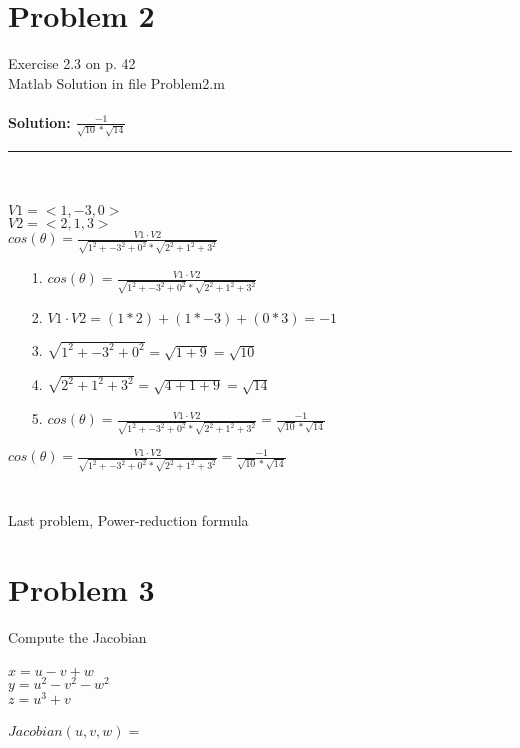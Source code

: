 \documentclass[12pt]{article}
\begin{document}
\section{Problem 2}	
Exercise 2.3 on p. 42\\ 
Matlab Solution in file Problem2.m\\ \\
\textbf{Solution: {\LARGE $ \frac{-1}{\sqrt{10} * \sqrt{14}}$ }}\\

\noindent\rule{22cm}{0.4pt}
\\ \\
$V1 = <1, -3, 0> $\\
$V2 = <2, 1, 3> $\\

{\Large$cos(\theta) = \frac{ V1 \cdot V2}{\sqrt{1^2 + -3^2 + 0^2} * \sqrt{2^2 + 1^2 + 3^2}}$ }\\

\begin{enumerate}
\item[1. ] $cos(\theta) = \frac{ V1 \cdot V2}{\sqrt{1^2 + -3^2 + 0^2} * \sqrt{2^2 + 1^2 + 3^2}}$ 
\item[2. ] $V1 \cdot V2 = (1 * 2) + (1 * -3) + (0 * 3) = -1 $
\item[3. ] $\sqrt{1^2 + -3^2 + 0^2} = \sqrt{1 + 9} = \sqrt{10} $
\item[4. ] $ \sqrt{2^2 + 1^2 + 3^2} = \sqrt{4 + 1 + 9} = \sqrt{14}$
\item[5. ] $cos(\theta) = \frac{ V1 \cdot V2}{\sqrt{1^2 + -3^2 + 0^2} * \sqrt{2^2 + 1^2 + 3^2}} = \frac{-1}{\sqrt{10} * \sqrt{14}}$  
\end{enumerate}

{\LARGE $cos(\theta) = \frac{ V1 \cdot V2}{\sqrt{1^2 + -3^2 + 0^2} * \sqrt{2^2 + 1^2 + 3^2}} = \frac{-1}{\sqrt{10} * \sqrt{14}}$ }\\
\\ \\

Last problem, Power-reduction formula


\section{Problem 3}
Compute the Jacobian\\ \\
$x = u - v + w$\\
$y = u^2 - v^2 - w^2$\\
$z = u^3 + v$\\
\\
$Jacobian(u, v, w) = $\\
\end{document}
